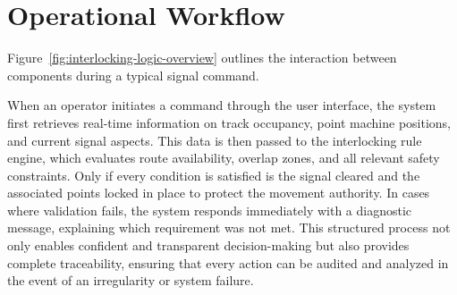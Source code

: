 \section{Operational Workflow}
\label{sec:system-overview:workflow}

Figure~\ref{fig:interlocking-logic-overview} outlines the interaction between components during a typical signal command.

When an operator initiates a command through the user interface, the system first retrieves real-time information on track occupancy, point machine positions, and current signal aspects. This data is then passed to the interlocking rule engine, which evaluates route availability, overlap zones, and all relevant safety constraints. Only if every condition is satisfied is the signal cleared and the associated points locked in place to protect the movement authority. In cases where validation fails, the system responds immediately with a diagnostic message, explaining which requirement was not met. This structured process not only enables confident and transparent decision-making but also provides complete traceability, ensuring that every action can be audited and analyzed in the event of an irregularity or system failure.

